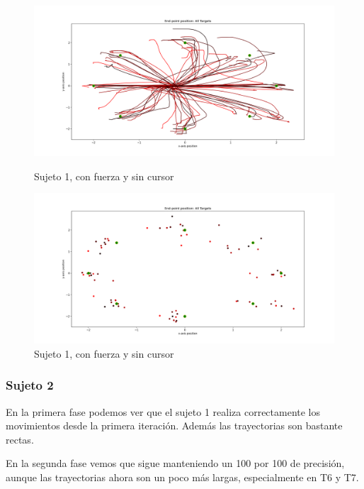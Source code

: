 \documentclass[a4paper,11pt, oneside]{book}
\begin{document}
\begin{figure}[H]
	\begin{minipage}[b]{0.5\linewidth}
		\centering
		\includegraphics[width=\linewidth]{sujeto1/force_no_cursor/trayectorias}
		\caption{Sujeto 1, con fuerza y sin cursor}
		\label{fig:figura1}
	\end{minipage}
	\hspace{0.5cm}
	\begin{minipage}[b]{0.5\linewidth}
		\centering
		\includegraphics[width=\linewidth]{sujeto1/force_no_cursor/trayectorias_puntos}
		\caption{Sujeto 1, con fuerza y sin cursor}
		\label{fig:figura2}
	\end{minipage}
\end{figure}


\subsubsection{Sujeto 2}

En la primera fase podemos ver que el sujeto 1 realiza correctamente los movimientos desde la primera iteración. Además las trayectorias son bastante rectas.

En la segunda fase vemos que sigue manteniendo un 100 por 100 de precisión, aunque las trayectorias ahora son un poco más largas, especialmente en T6 y T7.
\end{document}
